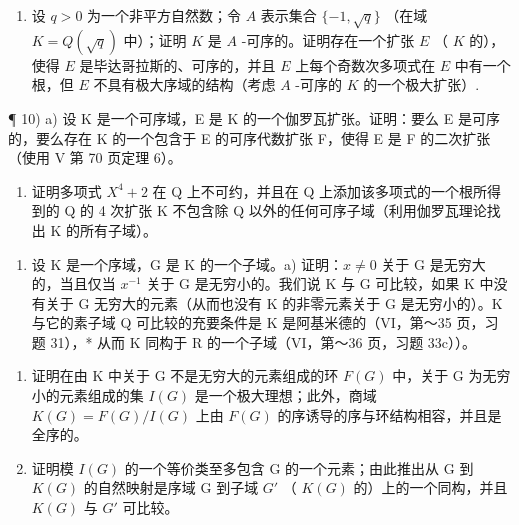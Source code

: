\begin{enumerate}
\def\labelenumi{\arabic{enumi})}
\setcounter{enumi}{8}
\tightlist
\item
  设 \(q > 0\) 为一个非平方自然数；令 \(A\) 表示集合 \(\{-1, \sqrt{q}\}\) （在域 \(K = Q(\sqrt{q})\) 中）；证明 \(K\) 是 \(A\) -可序的。证明存在一个扩张 \(E\) （ \(K\) 的），使得 \(E\) 是毕达哥拉斯的、可序的，并且 \(E\) 上每个奇数次多项式在 \(E\) 中有一个根，但 \(E\) 不具有极大序域的结构（考虑 \(A\) -可序的 \(K\) 的一个极大扩张）.
\end{enumerate}

¶ 10) a) 设 K 是一个可序域，E 是 K 的一个伽罗瓦扩张。证明：要么 E 是可序的，要么存在 K 的一个包含于 E 的可序代数扩张 F，使得 E 是 F 的二次扩张（使用 V 第 70 页定理 6）。

\begin{enumerate}
\def\labelenumi{\alph{enumi})}
\setcounter{enumi}{1}
\tightlist
\item
  证明多项式 \(X^{4} + 2\) 在 Q 上不可约，并且在 Q 上添加该多项式的一个根所得到的 Q 的 4 次扩张 K 不包含除 Q 以外的任何可序子域（利用伽罗瓦理论找出 K 的所有子域）。
\end{enumerate}

\begin{enumerate}
\def\labelenumi{\arabic{enumi})}
\setcounter{enumi}{10}
\tightlist
\item
  设 K 是一个序域，G 是 K 的一个子域。a) 证明：\(x \neq 0\) 关于 G 是无穷大的，当且仅当 \(x^{-1}\) 关于 G 是无穷小的。我们说 K 与 G 可比较，如果 K 中没有关于 G 无穷大的元素（从而也没有 K 的非零元素关于 G 是无穷小的）。K 与它的素子域 Q 可比较的充要条件是 K 是阿基米德的（VI，第～35 页，习题 31），* 从而 K 同构于 R 的一个子域（VI，第～36 页，习题 33c））。
\end{enumerate}

\begin{enumerate}
\def\labelenumi{\alph{enumi})}
\setcounter{enumi}{1}
\item
  证明在由 K 中关于 G 不是无穷大的元素组成的环 \(F(G)\) 中，关于 G 为无穷小的元素组成的集 \(I(G)\) 是一个极大理想；此外，商域 \(K(G) = F(G)/I(G)\) 上由 \(F(G)\) 的序诱导的序与环结构相容，并且是全序的。
\item
  证明模 \(I(G)\) 的一个等价类至多包含 G 的一个元素；由此推出从 G 到 \(K(G)\) 的自然映射是序域 G 到子域 \(G'\) （ \(K(G)\) 的）上的一个同构，并且 \(K(G)\) 与 \(G'\) 可比较。
\end{enumerate}

